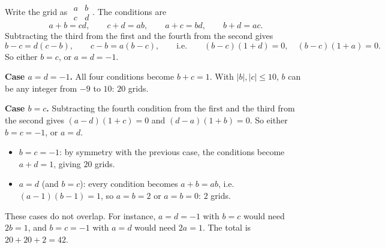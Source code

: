 Write the grid as $\begin{array}{cc}a&b\\c&d\end{array}$. The conditions are
\[a+b=cd,\qquad c+d=ab,\qquad a+c=bd,\qquad b+d=ac.\]
Subtracting the third from the first and the fourth from the second gives
\[b-c=d(c-b),\qquad c-b=a(b-c),\qquad\text{i.e.}\qquad(b-c)(1+d)=0,\quad(b-c)(1+a)=0.\]
So either $b=c$, or $a=d=-1$.

\textbf{Case $a=d=-1$.} All four conditions become $b+c=1$. With $|b|,|c|\le10$, $b$ can be any integer from $-9$ to $10$: $20$ grids.

\textbf{Case $b=c$.} Subtracting the fourth condition from the first and the third from the second gives $(a-d)(1+c)=0$ and $(d-a)(1+b)=0$. So either $b=c=-1$, or $a=d$.
\begin{itemize}
\item $b=c=-1$: by symmetry with the previous case, the conditions become $a+d=1$, giving $20$ grids.
\item $a=d$ (and $b=c$): every condition becomes $a+b=ab$, i.e. $(a-1)(b-1)=1$, so $a=b=2$ or $a=b=0$: $2$ grids.
\end{itemize}

These cases do not overlap. For instance, $a=d=-1$ with $b=c$ would need $2b=1$, and $b=c=-1$ with $a=d$ would need $2a=1$. The total is $20+20+2=\boxed{42}$.
